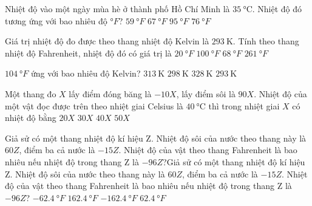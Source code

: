 \begin{ex}
	Nhiệt độ vào một ngày mùa hè ở thành phố Hồ Chí Minh là $\SI{35}{\celsius}$. Nhiệt độ đó tương ứng với bao nhiêu độ $\si{\degree F}$?
	\choice
	{$\SI{59}{\degree F}$}
	{$\SI{67}{\degree F}$}
	{\True $\SI{95}{\degree F}$}
	{$\SI{76}{\degree F}$}
\end{ex}
\begin{ex}
	Giá trị nhiệt độ đo được theo thang nhiệt độ Kelvin là $\SI{293}{\kelvin}$. Tính theo thang nhiệt độ Fahrenheit, nhiệt độ đó có giá trị là
	\choice
	{$\SI{20}{\degree F}$}
	{$\SI{100}{\degree F}$}
	{\True $\SI{68}{\degree F}$}
	{$\SI{261}{\degree F}$}
\end{ex}
\begin{ex}
	$\SI{104}{\degree F}$ ứng với bao nhiêu độ Kelvin?
	\choice
	{\True $\SI{313}{\kelvin}$}
	{$\SI{298}{\kelvin}$}
	{$\SI{328}{\kelvin}$}
	{$\SI{293}{\kelvin}$}
	\end{ex}
\begin{ex}
	Một thang đo $X$ lấy điểm đóng băng là $-10X$, lấy điểm sôi là $90X$. Nhiệt độ của một vật đọc được trên theo nhiệt giai Celsius là $\SI{40}{\celsius}$ thì trong nhiệt giai $X$ có nhiệt độ bằng
	\choice
	{$20X$}
	{\True $30X$}
	{$40X$}
	{$50X$}
\end{ex}
\begin{ex}
	Giả sử có một thang nhiệt độ kí hiệu Z. Nhiệt độ sôi của nước theo thang này là $60Z$, điểm ba cả nước là $-15Z$. Nhiệt độ của vật theo thang Fahrenheit là bao nhiêu nếu nhiệt độ trong thang Z là $-96Z$?Giả sử có một thang nhiệt độ kí hiệu Z. Nhiệt độ sôi của nước theo thang này là $60Z$, điểm ba cả nước là $-15Z$. Nhiệt độ của vật theo thang Fahrenheit là bao nhiêu nếu nhiệt độ trong thang Z là $-96Z$?
	\choice
	{$\SI{-62.4}{\degree F}$}
	{$\SI{162.4}{\degree F}$}
	{\True $\SI{-162.4}{\degree F}$}
	{$\SI{62.4}{\degree F}$}
\end{ex}
